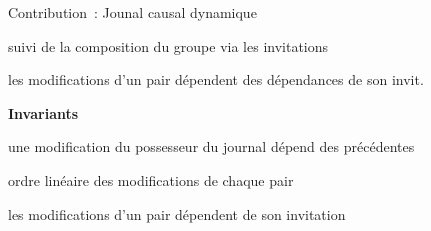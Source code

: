 \begin{frame}{Contribution~: Jounal causal dynamique}
    \begin{minipage}[c][.3\textheight][t]{\textwidth}
    \end{minipage}
    \begin{minipage}{\textwidth}
        \begin{compactitemize}
            \item suivi de la composition du groupe via les invitations
            \item les modifications d'un pair dépendent des dépendances de son invit.
        \end{compactitemize}
        \medskip
        \textbf{Invariants}
        \begin{compactenumerate}
            \item {une modification du possesseur du journal dépend des précédentes}
            \item {ordre linéaire des modifications de chaque pair}
            \item les modifications d'un pair dépendent de son invitation
        \end{compactenumerate}
    \end{minipage}
\end{frame}


